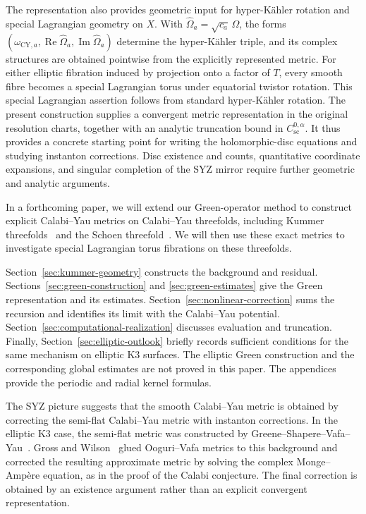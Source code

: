 \documentclass[11pt,a4paper,twoside]{article}
\numberwithin{equation}{section}
\theoremstyle{definition}
\theoremstyle{remark}
\begin{document}
The representation also provides geometric input for hyper-K\"ahler
rotation and special Lagrangian geometry on \(X\). With
\(\widehat\Omega_a=\sqrt{c_a}\,\Omega\), the forms
\((\omega_{\mathrm{CY},a},\operatorname{Re}\widehat\Omega_a,
\operatorname{Im}\widehat\Omega_a)\) determine the hyper-K\"ahler
triple, and its complex structures are obtained pointwise from the
explicitly represented metric. For either elliptic fibration induced
by projection onto a factor of \(T\), every smooth fibre becomes
a special Lagrangian torus under equatorial twistor rotation. This
special Lagrangian assertion follows from standard hyper-K\"ahler
rotation. The present construction supplies a convergent metric
representation in the original resolution charts, together with an
analytic truncation bound in \(C_{\mathrm{sc}}^{0,\alpha}\).
It thus provides a concrete starting point for writing the
holomorphic-disc equations and studying instanton corrections.
Disc existence and counts, quantitative coordinate expansions,
and singular completion of the SYZ mirror require further
geometric and analytic arguments.

In a forthcoming paper, we will extend our Green-operator method
to construct explicit Calabi--Yau metrics on Calabi--Yau threefolds,
including Kummer threefolds~\cite[p.~5]{Beauville1983} and the
Schoen threefold~\cite{Schoen1988}.
We will then use these exact metrics to investigate special
Lagrangian torus fibrations on these threefolds.

Section~\ref{sec:kummer-geometry} constructs the background and
residual. Sections~\ref{sec:green-construction} and
\ref{sec:green-estimates} give the Green representation and its
estimates. Section~\ref{sec:nonlinear-correction} sums the recursion
and identifies its limit with the Calabi--Yau potential.
Section~\ref{sec:computational-realization} discusses evaluation and
truncation. Finally, Section~\ref{sec:elliptic-outlook} briefly
records sufficient conditions for the same mechanism on
elliptic K3 surfaces.
The elliptic Green construction and the corresponding global
estimates are not proved in this paper. The appendices provide the
periodic and radial kernel formulas.

The SYZ picture suggests that the smooth Calabi--Yau metric is
obtained by correcting the semi-flat Calabi--Yau metric with
instanton corrections. In the elliptic K3 case, the semi-flat metric was
constructed by Greene--Shapere--Vafa--Yau~\cite{GreeneShapereVafaYau1990}.
Gross and Wilson~\cite{GrossWilson} glued Ooguri--Vafa metrics to
this background and corrected the resulting approximate metric
by solving the complex Monge--Amp\`ere equation, as in the proof
of the Calabi conjecture. The final correction is obtained by
an existence argument rather than an explicit convergent
representation.
\end{document}

